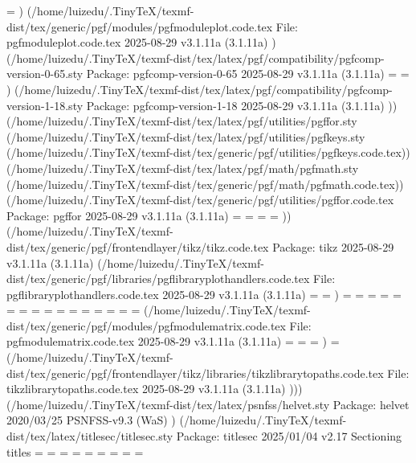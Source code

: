 \pgfnodeparttextbox=
) (/home/luizedu/.TinyTeX/texmf-dist/tex/generic/pgf/modules/pgfmoduleplot.code.tex
File: pgfmoduleplot.code.tex 2025-08-29 v3.1.11a (3.1.11a)
) (/home/luizedu/.TinyTeX/texmf-dist/tex/latex/pgf/compatibility/pgfcomp-version-0-65.sty
Package: pgfcomp-version-0-65 2025-08-29 v3.1.11a (3.1.11a)
\pgf@nodesepstart=
\pgf@nodesepend=
) (/home/luizedu/.TinyTeX/texmf-dist/tex/latex/pgf/compatibility/pgfcomp-version-1-18.sty
Package: pgfcomp-version-1-18 2025-08-29 v3.1.11a (3.1.11a)
)) (/home/luizedu/.TinyTeX/texmf-dist/tex/latex/pgf/utilities/pgffor.sty (/home/luizedu/.TinyTeX/texmf-dist/tex/latex/pgf/utilities/pgfkeys.sty (/home/luizedu/.TinyTeX/texmf-dist/tex/generic/pgf/utilities/pgfkeys.code.tex)) (/home/luizedu/.TinyTeX/texmf-dist/tex/latex/pgf/math/pgfmath.sty (/home/luizedu/.TinyTeX/texmf-dist/tex/generic/pgf/math/pgfmath.code.tex)) (/home/luizedu/.TinyTeX/texmf-dist/tex/generic/pgf/utilities/pgffor.code.tex
Package: pgffor 2025-08-29 v3.1.11a (3.1.11a)
\pgffor@iter=
\pgffor@skip=
\pgffor@stack=
\pgffor@toks=
)) (/home/luizedu/.TinyTeX/texmf-dist/tex/generic/pgf/frontendlayer/tikz/tikz.code.tex
Package: tikz 2025-08-29 v3.1.11a (3.1.11a)
(/home/luizedu/.TinyTeX/texmf-dist/tex/generic/pgf/libraries/pgflibraryplothandlers.code.tex
File: pgflibraryplothandlers.code.tex 2025-08-29 v3.1.11a (3.1.11a)
\pgf@plot@mark@count=
\pgfplotmarksize=
)
\tikz@lastx=
\tikz@lasty=
\tikz@lastxsaved=
\tikz@lastysaved=
\tikz@lastmovetox=
\tikz@lastmovetoy=
\tikzleveldistance=
\tikzsiblingdistance=
\tikz@figbox=
\tikz@figbox@bg=
\tikz@tempbox=
\tikz@tempbox@bg=
\tikztreelevel=
\tikznumberofchildren=
\tikznumberofcurrentchild=
\tikz@fig@count=
(/home/luizedu/.TinyTeX/texmf-dist/tex/generic/pgf/modules/pgfmodulematrix.code.tex
File: pgfmodulematrix.code.tex 2025-08-29 v3.1.11a (3.1.11a)
\pgfmatrixcurrentrow=
\pgfmatrixcurrentcolumn=
\pgf@matrix@numberofcolumns=
)
\tikz@expandcount=
(/home/luizedu/.TinyTeX/texmf-dist/tex/generic/pgf/frontendlayer/tikz/libraries/tikzlibrarytopaths.code.tex
File: tikzlibrarytopaths.code.tex 2025-08-29 v3.1.11a (3.1.11a)
))) (/home/luizedu/.TinyTeX/texmf-dist/tex/latex/psnfss/helvet.sty
Package: helvet 2020/03/25 PSNFSS-v9.3 (WaS) 
) (/home/luizedu/.TinyTeX/texmf-dist/tex/latex/titlesec/titlesec.sty
Package: titlesec 2025/01/04 v2.17 Sectioning titles
\ttl@box=
\beforetitleunit=
\aftertitleunit=
\ttl@plus=
\ttl@minus=
\ttl@toksa=
\titlewidth=
\titlewidthlast=
\titlewidthfirst=

